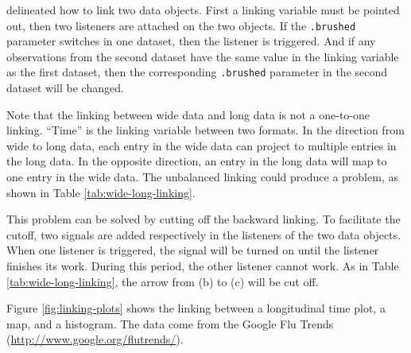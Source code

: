 \documentclass[12pt]{article}
\begin{document}
\citet{xie2014reactive} delineated how to link two data
objects. First a linking variable must be pointed out, then two listeners
are attached on the two objects. If the \texttt{.brushed} parameter
switches in one dataset, then the listener is triggered. And if any
observations from the second dataset have the same value in the linking
variable as the first dataset, then the corresponding \texttt{.brushed}
parameter in the second dataset will be changed.

Note that the linking between wide data and long data is not a one-to-one
linking. ``Time'' is the linking variable between two formats.
In the direction from wide to long data, each entry in the
wide data can project to multiple entries in the long data. In the
opposite direction, an entry in the long data will map to one entry in
the wide data. The unbalanced linking could produce a problem, as
shown in Table \ref{tab:wide-long-linking}.

This problem can be solved by cutting off the backward linking.
To facilitate the cutoff, two signals are added respectively
in the listeners of the two data objects. When one listener
is triggered, the signal will be turned on until the listener
finishes its work. During this period, the other listener cannot work.
As in Table \ref{tab:wide-long-linking}, the arrow from  (b) to  (c)
will be cut off.

Figure \ref{fig:linking-plots} shows the linking between
a longitudinal time plot, a map, and a histogram. The data
come from the Google Flu Trends
(\url{http://www.google.org/flutrends/}).
\end{document}
